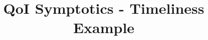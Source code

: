 \documentclass[conference]{IEEEtran}
\begin{document}
%
\title{QoI Symptotics - Timeliness Example}

\IEEEoverridecommandlockouts




%
\end{document}
